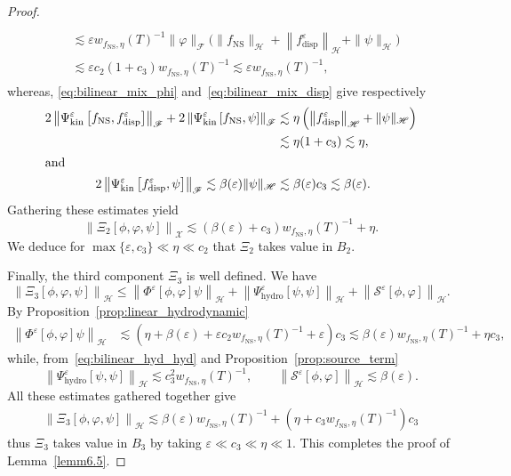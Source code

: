 \documentclass[AHL,Unicode,longabstracts,published]{cedram}
\newcommand{\ns}{\mathrm{NS}}
\newcommand{\hyd}{\mathrm{hydro}}
\newcommand{\kin}{\mathrm{kin}}
\newcommand{\disp}{\mathrm{disp}}
\renewcommand{\SS}{\mathcal{S}}
\newcommand{\FFF}{\mathscr{F}}
\newcommand{\HHH}{\mathscr{H}}
\newcommand{\GGG}{\mathscr{X}}
\newcommand{\SSSs}{\HHH}
\newcommand{\SSSl}{\GGG}
\newcommand{\SSSm}{\FFF}
\renewcommand*\le{\leqslant}
\newcommand*\eps{{\varepsilon}}
\begin{document}
\begin{proof}
\begin{multline*}
\\
\begin{aligned}
&\lesssim \eps w_{f_\ns, \eta}(T)^{-1} \| \varphi \|_{\SSSm}\bigg(\| f_\ns\|_{\SSSs} + \left\| f_\disp^\eps \right\|_{\SSSs} + \| \psi \|_{\SSSs}\bigg)\\
&\lesssim \eps c_2 (1 + c_3) w_{f_\ns, \eta}(T)^{-1} \lesssim \eps w_{f_\ns, \eta}(T)^{-1},
\end{aligned}
\end{multline*}
whereas, \eqref{eq:bilinear_mix_phi} and~\eqref{eq:bilinear_mix_disp} give respectively
\begin{align*}
2 \left\| \Psi^\eps_\kin\left[f_\ns, f^\eps_\disp \right] \right\|_{ \SSSm } + 2 \left\| \Psi^\eps_\kin\left[f_\ns, \psi \right] \right\|_{ \SSSm } & \lesssim \eta\left(\left\| f^\eps_\disp\right\|_{\SSSs} + \| \psi \|_{\SSSs}\right) \\
&\lesssim\eta (1+c_3) \lesssim \eta,
\\
\intertext{and}
2 \left\| \Psi^\eps_\kin\left[f^\eps_\disp, \psi \right] \right\|_{ \SSSm } \lesssim \beta(\eps)\| \psi\|_{\SSSs}
&\lesssim \beta(\eps) c_3 \lesssim \beta(\eps).
\end{align*}
Gathering these estimates yield
\[
\left\| \Xi_2\left[\phi, \varphi, \psi\right] \right\|_{\SSSl} \lesssim \left(\beta(\eps) + c_3\right) w_{f_\ns, \eta}(T)^{-1} + \eta.
\]
We deduce for $\max\{ \eps, c_3 \} \ll \eta \ll c_2$ that $\Xi_2$ takes value in $B_2$.

\vspace*{4pt}
Finally, the third component $\Xi_3$ is well defined. We have
\[
\left\| \Xi_3\left[\phi, \varphi, \psi\right]\right\|_{\SSSs} \le \left\| \Phi^\eps[\phi, \varphi] \psi \right\|_{\SSSs} + \left\| \Psi^\eps_\hyd [\psi, \psi] \right\|_{\SSSs} + \left\| \SS^\eps[\phi, \varphi] \right\|_{\SSSs}.
\]
By Proposition~\ref{prop:linear_hydrodynamic}
\begin{align*}
\left\| \Phi^\eps[\phi, \varphi] \psi \right\|_{\SSSs} & \lesssim \left(\eta + \beta(\eps) + \eps c_2 w_{f_\ns, \eta}(T)^{-1} + \eps \right) c_3 \lesssim \beta(\eps) w_{f_\ns, \eta}(T)^{-1} + \eta c_3,
\end{align*}
while, from~\eqref{eq:bilinear_hyd_hyd} and Proposition~\ref{prop:source_term}
\[
\left\| \Psi^\eps_\hyd [\psi, \psi] \right\|_{\SSSs} \lesssim c_3^2 w_{f_\ns, \eta}(T)^{-1}, \qquad \left\| \SS^\eps[\phi, \varphi] \right\|_{ \SSSs } \lesssim \beta(\eps).
\]
All these estimates gathered together give
\begin{align*}
\left\| \Xi_3[\phi, \varphi, \psi] \right\|_{\SSSs} \lesssim \beta(\eps) w_{ f_\ns, \eta }(T)^{-1} + \left(\eta + c_3 w_{ f_\ns, \eta }(T)^{-1} \right) c_3
\end{align*}
thus $\Xi_3$ takes value in $B_3$ by taking $\eps \ll c_3 \ll \eta \ll 1$. This completes the proof of Lemma~\ref{lemm6.5}.
\end{proof}
\end{document}
